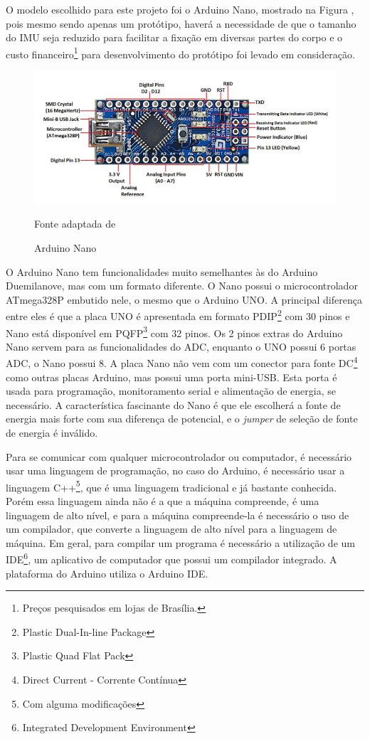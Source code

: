 O  modelo escolhido para este projeto foi o Arduino Nano, mostrado na Figura , pois mesmo sendo apenas um protótipo, haverá a necessidade de que o tamanho do IMU seja reduzido para facilitar a fixação em diversas partes do corpo e o custo financeiro\footnote{Preços pesquisados em lojas de Brasília.} para desenvolvimento do protótipo foi levado em consideração.

\begin{figure}[h]
	\centering
	\includegraphics[keepaspectratio=true,scale=0.7
	]{figuras/arduino_nano.png}
	\caption{ Arduino Nano }
	Fonte adaptada de \cite{john2018}
	\label{arduno}	
\end{figure}


O Arduino Nano tem funcionalidades muito semelhantes às do Arduino Duemilanove, mas com um formato diferente. O Nano possui o microcontrolador ATmega328P embutido nele, o mesmo que o Arduino UNO. A principal diferença entre eles é que a placa UNO é apresentada em formato PDIP\footnote{Plastic Dual-In-line Package} com 30 pinos e Nano está disponível em PQFP\footnote{Plastic Quad Flat Pack} com 32 pinos. Os 2 pinos extras do Arduino Nano servem para as funcionalidades do ADC, enquanto o UNO possui 6 portas ADC, o Nano possui 8. A placa Nano não vem com um conector para fonte DC\footnote{Direct Current - Corrente Contínua} como outras placas Arduino, mas possui uma porta mini-USB. Esta porta é usada para programação, monitoramento serial e alimentação de energia, se necessário. A característica fascinante do Nano é que ele escolherá a fonte de energia mais forte com sua diferença de potencial, e o \textit{jumper} de seleção de fonte de energia é inválido\cite{john2018}.  

Para se comunicar com qualquer microcontrolador ou computador, é necessário usar uma linguagem de programação, no caso do Arduino, é necessário usar a linguagem C++\footnote{Com alguma modificações}, que é uma linguagem tradicional e já bastante conhecida. Porém essa linguagem ainda não é a que a máquina compreende, é uma linguagem de alto nível, e para a máquina compreende-la é necessário o uso de um compilador, que converte a linguagem de alto nível para a linguagem de máquina. Em geral, para compilar um programa é necessário a utilização de um IDE\footnote{Integrated Development Environment}, um aplicativo de computador que possui um compilador integrado. A plataforma do Arduino utiliza o Arduino IDE\cite{chavier2016}. 


